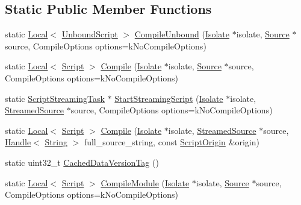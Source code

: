 \subsection*{Static Public Member Functions}
\begin{DoxyCompactItemize}
\item 
static \hyperlink{classv8_1_1_local}{Local}$<$ \hyperlink{classv8_1_1_unbound_script}{Unbound\+Script} $>$ \hyperlink{classv8_1_1_script_compiler_a5f590f94e2705d12392c17b7fa097e1d}{Compile\+Unbound} (\hyperlink{classv8_1_1_isolate}{Isolate} $\ast$isolate, \hyperlink{classv8_1_1_script_compiler_1_1_source}{Source} $\ast$source, Compile\+Options options=k\+No\+Compile\+Options)
\item 
static \hyperlink{classv8_1_1_local}{Local}$<$ \hyperlink{classv8_1_1_script}{Script} $>$ \hyperlink{classv8_1_1_script_compiler_a4cef8b34c2744f6508a9ce53182c19bf}{Compile} (\hyperlink{classv8_1_1_isolate}{Isolate} $\ast$isolate, \hyperlink{classv8_1_1_script_compiler_1_1_source}{Source} $\ast$source, Compile\+Options options=k\+No\+Compile\+Options)
\item 
static \hyperlink{classv8_1_1_script_compiler_1_1_script_streaming_task}{Script\+Streaming\+Task} $\ast$ \hyperlink{classv8_1_1_script_compiler_a406bb44ef02d644d94bccd3f7b04f2d4}{Start\+Streaming\+Script} (\hyperlink{classv8_1_1_isolate}{Isolate} $\ast$isolate, \hyperlink{classv8_1_1_script_compiler_1_1_streamed_source}{Streamed\+Source} $\ast$source, Compile\+Options options=k\+No\+Compile\+Options)
\item 
static \hyperlink{classv8_1_1_local}{Local}$<$ \hyperlink{classv8_1_1_script}{Script} $>$ \hyperlink{classv8_1_1_script_compiler_a45b17bbe1da31c32e3783b91bdde9fcb}{Compile} (\hyperlink{classv8_1_1_isolate}{Isolate} $\ast$isolate, \hyperlink{classv8_1_1_script_compiler_1_1_streamed_source}{Streamed\+Source} $\ast$source, \hyperlink{classv8_1_1_handle}{Handle}$<$ \hyperlink{classv8_1_1_string}{String} $>$ full\+\_\+source\+\_\+string, const \hyperlink{classv8_1_1_script_origin}{Script\+Origin} \&origin)
\item 
static uint32\+\_\+t \hyperlink{classv8_1_1_script_compiler_aea78877b0dccde1e587ee1ddeda1c155}{Cached\+Data\+Version\+Tag} ()
\item 
static \hyperlink{classv8_1_1_local}{Local}$<$ \hyperlink{classv8_1_1_script}{Script} $>$ \hyperlink{classv8_1_1_script_compiler_a96bafa715e4a9c413824f2ce6c7db434}{Compile\+Module} (\hyperlink{classv8_1_1_isolate}{Isolate} $\ast$isolate, \hyperlink{classv8_1_1_script_compiler_1_1_source}{Source} $\ast$source, Compile\+Options options=k\+No\+Compile\+Options)

\end{DoxyCompactItemize}
